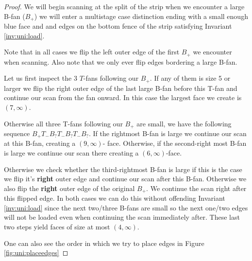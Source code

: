 \begin{proof}
  We will begin scanning at the split of the strip when we encounter a large B-fan ($B_+$) we  will enter a multistage case distinction ending with a small enough blue face and and edges on the bottom fence of the strip satisfying Invariant \ref{inv:uni:load}.

  Note that in all cases we flip the left outer edge of the first $B_+$ we encounter when scanning. Also note that we only ever flip edges bordering a large B-fan.

  Let us first inspect the 3 $T$-fans following our $B_+$. If any of them is size 5 or larger we flip the right outer edge of the last large B-fan before this T-fan and continue our scan from the fan onward. In this case the largest face we create is $(7, \infty)$.

  Otherwise all three T-fans following our $B_+$ are small, we have the following sequence $B_+ T_- B_? T_- B_? T_- B_?$. If the rightmost B-fan is large we continue our scan at this B-fan, creating a $(9, \infty)$- face. Otherwise, if the second-right most B-fan is large we continue our scan there creating a $(6, \infty)$-face.

  Otherwise we check whether the third-rightmost B-fan is large if this is the case we flip it's \textbf{right} outer edge and continue our scan after this B-fan. Otherwise we also flip the \textbf{right} outer edge of the original $B_+$. We continue the scan right after this flipped edge. In both cases we can do this without offending Invariant \ref{inv:uni:load} since the next two/three B-fans are small so the next one/two edges will not be loaded even when continuing the scan immediately after. These last two steps yield faces of size at most $(4, \infty)$.

  One can also see the order in which we try to place edges in Figure \ref{fig:uni:placeedges}


\end{proof}
